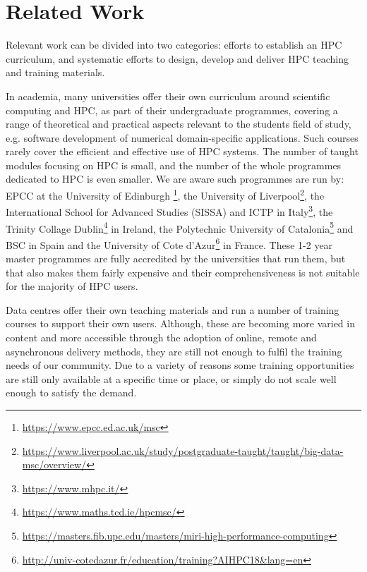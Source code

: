 \documentclass[jocse]{jocseart}
\begin{document}
\section{Related Work}

\label{sec:related}

Relevant work can be divided into two categories: efforts to establish an HPC curriculum, and systematic efforts to design, develop and deliver HPC teaching and training materials.

In academia, many universities offer their own curriculum around scientific computing and HPC, as part of their undergraduate programmes, covering a range of theoretical and practical aspects relevant to the students field of study, e.g. software development of numerical domain-specific applications.
Such courses rarely cover the efficient and effective use of HPC systems. 
The number of taught modules focusing on HPC is small, and the number of the whole programmes dedicated to HPC is even smaller. We are aware such programmes are run by: EPCC at the University of Edinburgh \footnote{\url{https://www.epcc.ed.ac.uk/msc}}, the University of Liverpool\footnote{\url{https://www.liverpool.ac.uk/study/postgraduate-taught/taught/big-data-msc/overview/}}, the International School for Advanced Studies (SISSA) and ICTP in Italy\footnote{\url{https://www.mhpc.it/}}, the Trinity Collage Dublin\footnote{\url{https://www.maths.tcd.ie/hpcmsc/}} in Ireland, the Polytechnic University of Catalonia\footnote{\url{https://masters.fib.upc.edu/masters/miri-high-performance-computing}} and BSC in Spain and the University of Cote d'Azur\footnote{\url{http://univ-cotedazur.fr/education/training?AIHPC18&lang=en}} in France. These 1-2 year master programmes are fully accredited by the universities that run them, but that also makes them fairly expensive and their comprehensiveness is not suitable for the majority of HPC users. 

Data centres offer their own teaching materials and run a number of training courses to support their own users. 
Although, these are becoming more varied in content and more accessible through the adoption of online, remote and asynchronous delivery methods, they are still not enough to fulfil the training needs of our community. Due to a variety of reasons some training opportunities are still only available at a specific time or place, or simply do not scale well enough to satisfy the demand.
\end{document}
